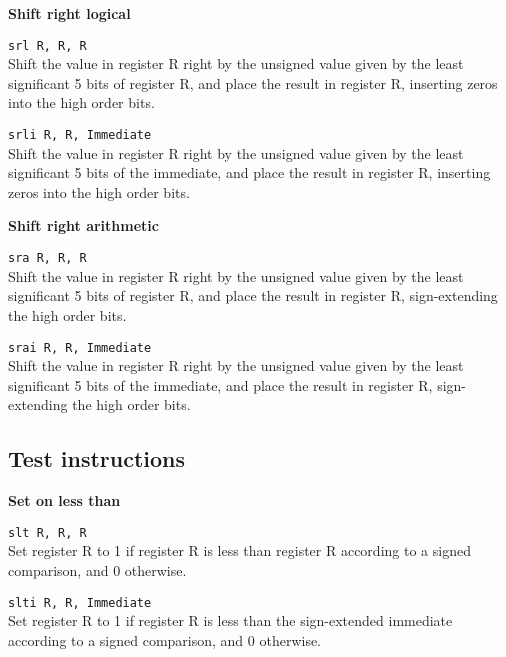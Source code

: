 \documentclass[12pt]{report}
\newcommand\subscr[1]{\raisebox{-0.5ex}{\small #1}}
\newcommand\regs{R\subscr{s}}
\newcommand\regd{R\subscr{d}}
\newcommand\regt{R\subscr{t}}
\begin{document}
\noindent
{\bf Shift right logical}

\texttt{srl \regd, \regs, \regt}\\
Shift the value in register \regs{} right by the unsigned value given by the
least significant 5 bits of register \regt{}, and place the result in register \regd{},
inserting zeros into the high order bits.
\vspace{1ex}

\texttt{srli \regd, \regs, Immediate}\\
Shift the value in register \regs{} right by the unsigned value given by the
least significant 5 bits of the immediate, and place the result in register \regd{},
inserting zeros into the high order bits.
\vspace{1ex}

\noindent
{\bf Shift right arithmetic}

\texttt{sra \regd, \regs, \regt}\\
Shift the value in register \regs{} right by the unsigned value given by the
least significant 5 bits of register \regt{}, and place the result in register \regd{},
sign-extending the high order bits.
\vspace{1ex}

\texttt{srai \regd, \regs, Immediate}\\
Shift the value in register \regs{} right by the unsigned value given by the
least significant 5 bits of the immediate, and place the result in register \regd{},
sign-extending the high order bits.
\vspace{1ex}

\subsection{Test instructions}

\noindent
{\bf Set on less than}

\texttt{slt \regd, \regs, \regt}\\
Set register \regd{} to 1 if register \regs{} is
less than register \regt{} according to a signed comparison, and 0 otherwise.
\vspace{1ex}

\texttt{slti \regd, \regs, Immediate}\\
Set register \regd{} to 1 if register \regs{} is
less than the sign-extended immediate according to a signed comparison, and 0 otherwise.
\vspace{1ex}
\end{document}
